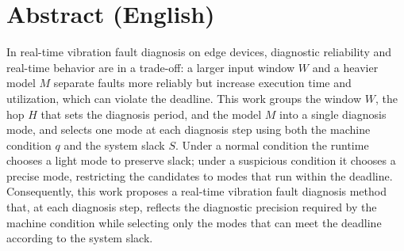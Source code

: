 \documentclass[10pt]{article}
\begin{document}
\section{Abstract (English)}
In real-time vibration fault diagnosis on edge devices, diagnostic reliability and real-time behavior are in a trade-off: a larger input window $W$ and a heavier model $M$ separate faults more reliably but increase execution time and utilization, which can violate the deadline. This work groups the window $W$, the hop $H$ that sets the diagnosis period, and the model $M$ into a single diagnosis mode, and selects one mode at each diagnosis step using both the machine condition $q$ and the system slack $S$. Under a normal condition the runtime chooses a light mode to preserve slack; under a suspicious condition it chooses a precise mode, restricting the candidates to modes that run within the deadline. Consequently, this work proposes a real-time vibration fault diagnosis method that, at each diagnosis step, reflects the diagnostic precision required by the machine condition while selecting only the modes that can meet the deadline according to the system slack.
\end{document}
